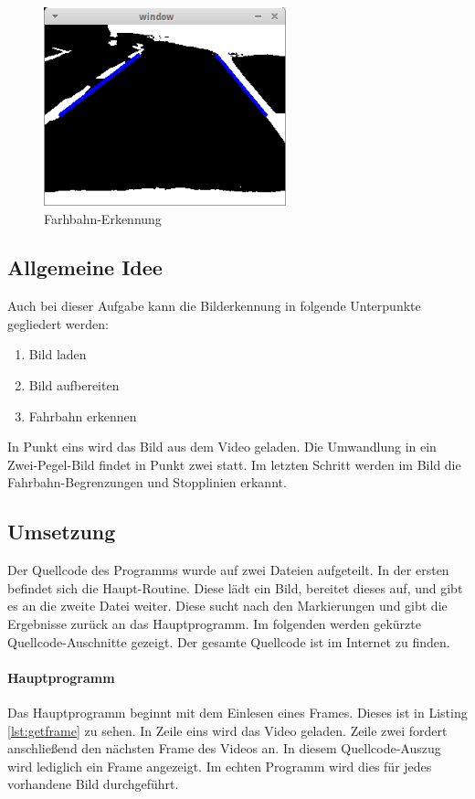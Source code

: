\documentclass[a4paper,DIV=calc,ngerman]{scrartcl}
\begin{document}
\begin{figure}
\centering
\includegraphics[width=7cm]{bv1}
\caption{Farhbahn-Erkennung}
\label{fig:bv1}
\end{figure}

\subsection{Allgemeine Idee}
\label{sec:a2idee}
Auch bei dieser Aufgabe kann die Bilderkennung in folgende Unterpunkte gegliedert werden:

\begin{enumerate}
    \item Bild laden
    \item Bild aufbereiten
    \item Fahrbahn erkennen
\end{enumerate}

In Punkt eins wird das Bild aus dem Video geladen. Die Umwandlung in ein Zwei-Pegel-Bild findet in Punkt zwei statt. Im letzten Schritt werden im Bild die Fahrbahn-Begrenzungen und Stopplinien erkannt.

\subsection{Umsetzung}
\label{sec:a2umsetzung}
Der Quellcode des Programms wurde auf zwei Dateien aufgeteilt. In der ersten befindet sich die Haupt-Routine. Diese lädt ein Bild, bereitet dieses auf, und gibt es an die zweite Datei weiter. Diese sucht nach den Markierungen und gibt die Ergebnisse zurück an das Hauptprogramm. Im folgenden werden gekürzte Quellcode-Auschnitte gezeigt. Der gesamte Quellcode ist im Internet zu finden.

\paragraph{Hauptprogramm}
Das Hauptprogramm beginnt mit dem Einlesen eines Frames. Dieses ist in Listing \ref{lst:getframe} zu sehen. In Zeile eins wird das Video geladen. Zeile zwei fordert anschließend den nächsten Frame des Videos an. In diesem Quellcode-Auszug wird lediglich ein Frame angezeigt. Im echten Programm wird dies für jedes vorhandene Bild durchgeführt.
\end{document}
